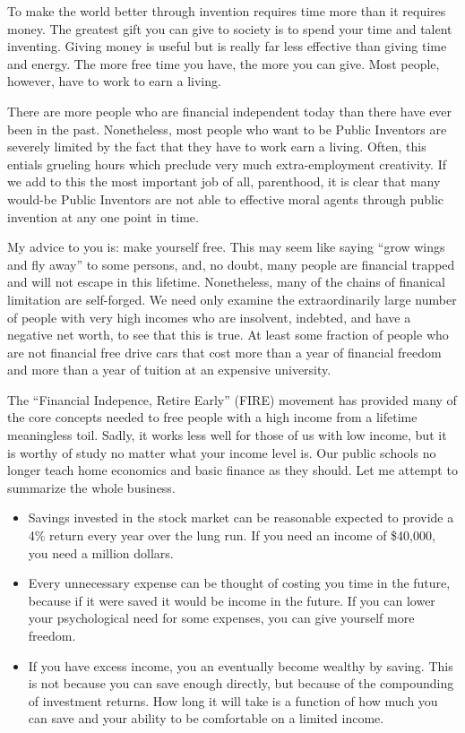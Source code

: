 \documentclass[
	fontsize=10pt, %
	twoside=false, %
	secnumdepth=1, %
]{kaobook}
\begin{document}
To make the world better through invention requires time more
than it requires money. The greatest gift you can give to society
is to spend your time and talent inventing. Giving money is useful but
is really far less effective than giving time and energy. The more
free time you have, the more you can give. Most people, however,
have to work to earn a living.

There are more people who are financial independent today than there
have ever been in the past. Nonetheless, most people who want to be
Public Inventors are severely limited by the fact that they have to
work earn a living. Often, this entials grueling hours which preclude
very much extra-employment creativity. If we add to this the most
important job of all, parenthood, it is clear that many would-be
Public Inventors are not able to effective moral agents through public
invention at any one point in time.

My advice to you is: make yourself free. This may seem like
saying ``grow wings and fly away'' to some persons, and,
no doubt, many people are financial trapped and will not
escape in this lifetime.
Nonetheless, many of the chains of finanical limitation are
self-forged. We need only examine the extraordinarily large
number of people with very high incomes who are insolvent,
indebted, and have a negative net worth, to see that this is true.
At least some fraction of people who are not financial free
drive cars that cost more than a year of financial freedom and more
than a year of tuition at an expensive university.

The ``Financial Indepence, Retire Early'' (FIRE) movement has
provided many of the core concepts needed to free people with
a high income from a lifetime meaningless toil. Sadly, it works
less well for those of us with low income, but it is worthy of study
no matter what your income level is.
Our public schools no longer teach home economics and basic
finance as they should. Let me attempt to summarize the whole
business.

\begin{itemize}
\item Savings invested in the stock market can be reasonable expected to provide a 4\% return every
  year over the lung run.
If you need an income of \$40,000, you need a million dollars.
\item Every unnecessary expense can be thought of costing you time in
  the future, because if it were saved it would be income in the
  future. If you can lower your psychological need for some expenses,
you can give yourself more freedom.
\item If you have excess income, you an eventually become wealthy
by saving. This is not because you can save enough directly, but
because of the compounding of investment returns. How long it will take
is a function of how much you can save and your ability to be
comfortable on a limited income.
\end{itemize}
\end{document}

